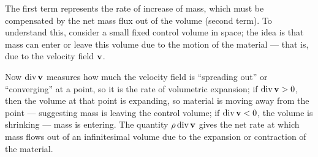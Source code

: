 The first term represents the rate of increase of mass, which  must be compensated by the net mass flux out of the volume (second term). To understand this, consider a small fixed control volume in space; the idea is that mass can enter or leave this volume due to the motion of the material --- that is, due to the velocity field $\mathbf{v}$.

Now $\operatorname{div}\mathbf{v}$ measures how much the velocity field is ``spreading out'' or ``converging'' at a point, so it is the rate of volumetric expansion; if $\operatorname{div}\mathbf{v}>0$, then the volume at that point is expanding, so material is moving away from the point --- suggesting mass is leaving the control volume;  if $\operatorname{div}\mathbf{v}<0$, the volume is shrinking --- mass is entering. The quantity  $\rho \operatorname{div} \mathbf{v}$  gives the net rate at which mass flows out of an infinitesimal volume due to the expansion or contraction of the material.

